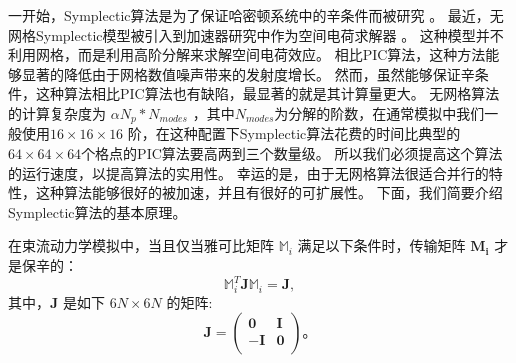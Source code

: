 {一开始，Symplectic算法是为了保证哈密顿系统中的辛条件而被研究 \cite{symplectic_channel1990, symplectic_yoshida1990}。
最近，无网格Symplectic模型被引入到加速器研究中作为空间电荷求解器 \cite{symplectic_ji2017}。
这种模型并不利用网格，而是利用高阶分解来求解空间电荷效应。
相比PIC算法，这种方法能够显著的降低由于网格数值噪声带来的发射度增长。
然而，虽然能够保证辛条件，这种算法相比PIC算法也有缺陷，最显著的就是其计算量更大。
无网格算法的计算复杂度为 $\alpha N_p * N_{modes}$ ，其中$N_{modes}$为分解的阶数，在通常模拟中我们一般使用$16 \times 16 \times 16$ 阶，在这种配置下Symplectic算法花费的时间比典型的$64 \times 64 \times 64$个格点的PIC算法要高两到三个数量级。
所以我们必须提高这个算法的运行速度，以提高算法的实用性。
幸运的是，由于无网格算法很适合并行的特性，这种算法能够很好的被加速，并且有很好的可扩展性。
下面，我们简要介绍Symplectic算法的基本原理。

在束流动力学模拟中，当且仅当雅可比矩阵 $\mathbb{M}_i$ 满足以下条件时，传输矩阵 $\mathbf{M_i}$ 才是保辛的\cite{accelerator2004lee, accelerator2013chao}：
\begin{equation}
\mathbb{M}_{i}^{T} \mathbf{J} \mathbb{M}_{i}=\mathbf{J},
\end{equation}
其中，$\mathbf{J}$ 是如下 $6N\times6N$ 的矩阵:
\begin{equation}
\mathbf{J}=\left(
  \begin{array}{cc}
     \mathbf{0} & \mathbf{I} \\
    -\mathbf{I} & \mathbf{0} \\
  \end{array}
\right) \text{。}
\end{equation}

}

